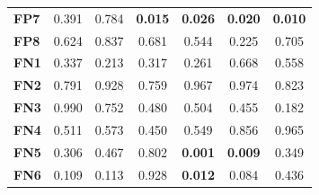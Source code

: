 \begin{table}
\begin{tabular}{lccc|ccc}
        \textbf{FP7}  & 0.391                                   & 0.784                                             & \cellcolor[HTML]{EFEFEF}\textbf{0.015} & \cellcolor[HTML]{EFEFEF}\textbf{0.026}   & \cellcolor[HTML]{EFEFEF}\textbf{0.020} & \cellcolor[HTML]{EFEFEF}\textbf{0.010} \\
        \textbf{FP8}  & 0.624                                   & 0.837                                             & 0.681                                  & 0.544                                    & 0.225                                  & 0.705                                  \\
        \textbf{FN1}  & 0.337                                   & 0.213                                             & 0.317                                  & 0.261                                    & 0.668                                  & 0.558                                  \\
        \textbf{FN2}  & 0.791                                   & 0.928                                             & 0.759                                  & 0.967                                    & 0.974                                  & 0.823                                  \\
        \textbf{FN3}  & 0.990                                   & 0.752                                             & 0.480                                  & 0.504                                    & 0.455                                  & 0.182                                  \\
        \textbf{FN4}  & 0.511                                   & 0.573                                             & 0.450                                  & 0.549                                    & 0.856                                  & 0.965                                  \\
        \textbf{FN5}  & 0.306                                   & 0.467                                             & 0.802                                  & \cellcolor[HTML]{EFEFEF}\textbf{0.001}   & \cellcolor[HTML]{EFEFEF}\textbf{0.009} & 0.349                                  \\
        \textbf{FN6}  & 0.109                                   & 0.113                                             & 0.928                                  & \cellcolor[HTML]{EFEFEF}\textbf{0.012}   & 0.084                                  & 0.436                                  \\

\end{tabular}
\end{table}

